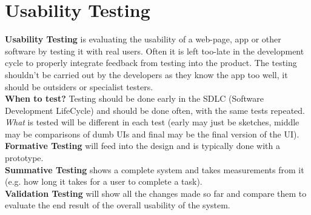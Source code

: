 \documentclass[a4paper,11pt]{article}
\begin{document}
\section{Usability Testing}
\textbf{Usability Testing} is evaluating the usability of a web-page, app or other software by testing it with real users. Often it is left too-late in the development cycle to properly integrate feedback from testing into the product. The testing shouldn't be carried out by the developers as they know the app too well, it should be outsiders or specialist testers.\\
\textbf{When to test?} Testing should be done early in the SDLC (Software Development LifeCycle) and should be done often, with the same tests repeated. \textit{What} is tested will be different in each test (early may just be sketches, middle may be comparisons of dumb UIs and final may be the final version of the UI).\\
\textbf{Formative Testing} will feed into the design and is typically done with a prototype.\\
\textbf{Summative Testing} shows a complete system and takes measurements from it (e.g. how long it takes for a user to complete a task).\\
\textbf{Validation Testing} will show all the changes made so far and compare them to evaluate the end result of the overall usability of the system.
\end{document}
